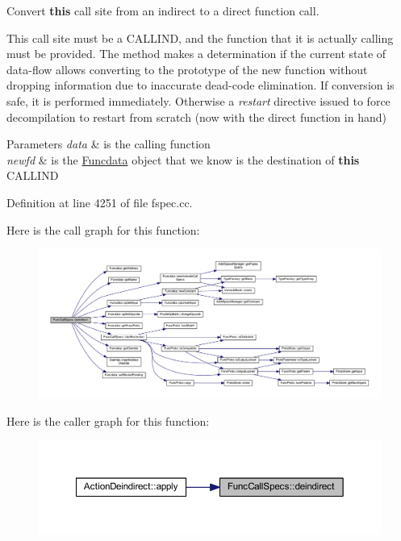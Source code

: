 Convert {\bfseries{this}} call site from an indirect to a direct function call. 

This call site must be a C\+A\+L\+L\+I\+ND, and the function that it is actually calling must be provided. The method makes a determination if the current state of data-\/flow allows converting to the prototype of the new function without dropping information due to inaccurate dead-\/code elimination. If conversion is safe, it is performed immediately. Otherwise a {\itshape restart} directive issued to force decompilation to restart from scratch (now with the direct function in hand) 
\begin{DoxyParams}{Parameters}
{\em data} & is the calling function \\
\hline
{\em newfd} & is the \mbox{\hyperlink{class_funcdata}{Funcdata}} object that we know is the destination of {\bfseries{this}} C\+A\+L\+L\+I\+ND \\
\hline
\end{DoxyParams}


Definition at line 4251 of file fspec.\+cc.

Here is the call graph for this function\+:
\nopagebreak
\begin{figure}[H]
\begin{center}
\leavevmode
\includegraphics[width=350pt]{class_func_call_specs_aad64d557811baf4602afcefb2746f7be_cgraph}
\end{center}
\end{figure}
Here is the caller graph for this function\+:
\nopagebreak
\begin{figure}[H]
\begin{center}
\leavevmode
\includegraphics[width=350pt]{class_func_call_specs_aad64d557811baf4602afcefb2746f7be_icgraph}
\end{center}
\end{figure}
\mbox{\label{class_func_call_specs_a489441d9d77d08bdf87eff937e8ef5b8}} 

